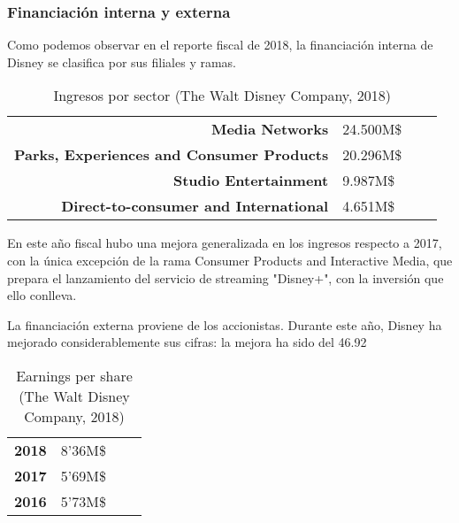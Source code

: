 \subsubsection{Financiación interna y externa}
Como podemos observar en el reporte fiscal de 2018, la financiación interna de Disney se clasifica por sus filiales y ramas. 

\begin{table}[]
\centering
\begin{tabular}{rlrl}
\textbf{Media Networks} & 24.500M\$ \\
 
\textbf{Parks, Experiences and Consumer Products} & 20.296M\$ \\
 
\textbf{Studio Entertainment} & 9.987M\$ \\

\textbf{Direct-to-consumer and International} & 4.651M\$ \\

\end{tabular}
\caption{\label{fig:frog} Ingresos por sector (The Walt Disney Company, 2018)}
\end{table}

En este año fiscal hubo una mejora generalizada en los ingresos respecto a 2017, con la única excepción de la rama Consumer Products and Interactive Media, que prepara el lanzamiento del servicio de streaming "Disney+", con la inversión que ello conlleva.


La financiación externa proviene de los accionistas. Durante este año, Disney ha mejorado considerablemente sus cifras: la mejora ha sido del 46.92%

\begin{table}[]
\centering
\begin{tabular}{rlrl}
\textbf{2018} & 8'36M\$ \\
 
\textbf{2017} & 5'69M\$ \\

\textbf{2016} & 5'73M\$ \\

\end{tabular}
\caption{\label{fig:frog} Earnings per share (The Walt Disney Company, 2018)}
\end{table}